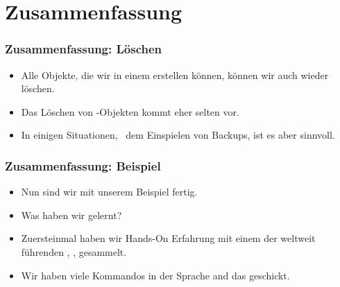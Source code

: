 \documentclass[aspectratio=169,mathserif,notheorems]{beamer}%
\begin{document}
\section{Zusammenfassung}%
%
\begin{frame}%
\frametitle{Zusammenfassung: Löschen}%
\begin{itemize}%
\item Alle Objekte, die wir in einem  erstellen können, können wir auch wieder löschen.%
%
\item<2-> Das Löschen von -Objekten kommt eher selten vor.%
%
\item<3-> In einigen Situationen, \DEzB\ dem Einspielen von Backups, ist es aber sinnvoll.%
\end{itemize}%
\end{frame}%
%
\begin{frame}%
\frametitle{Zusammenfassung: Beispiel}%
\begin{itemize}%
%
\item Nun sind wir mit unserem Beispiel fertig.%
%
\item<2-> Was haben wir gelernt?%
%
\item<3-> Zuersteinmal haben wir Hands-On Erfahrung mit einem der weltweit führenden , \postgresql, gesammelt.%
%
\item<4-> Wir haben viele Kommandos in der Sprache  and das  geschickt.%
%
\end{itemize}%
\end{frame}%
%
%
\end{document}
